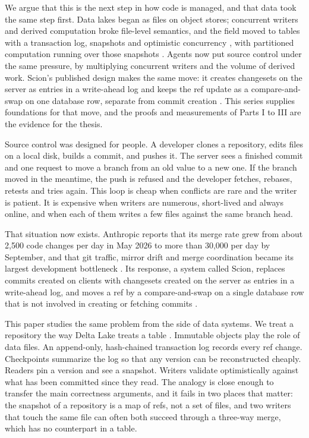 \documentclass[11pt,letterpaper]{article}
\theoremstyle{definition}
\theoremstyle{remark}
\begin{document}
We argue that this is the next step in how code is managed, and that data took the same step first. Data lakes began as files on object stores; concurrent writers and derived computation broke file-level semantics, and the field moved to tables with a transaction log, snapshots and optimistic concurrency \cite{armbrust2020delta,icebergspec}, with partitioned computation running over those snapshots \cite{zaharia2012rdd}. Agents now put source control under the same pressure, by multiplying concurrent writers and the volume of derived work. Scion's published design makes the same move: it creates changesets on the server as entries in a write-ahead log and keeps the ref update as a compare-and-swap on one database row, separate from commit creation \cite{anthropic2026scion}. This series supplies foundations for that move, and the proofs and measurements of Parts I to III are the evidence for the thesis.

Source control was designed for people. A developer clones a repository, edits files on a local disk, builds a commit, and pushes it. The server sees a finished commit and one request to move a branch from an old value to a new one. If the branch moved in the meantime, the push is refused and the developer fetches, rebases, retests and tries again. This loop is cheap when conflicts are rare and the writer is patient. It is expensive when writers are numerous, short-lived and always online, and when each of them writes a few files against the same branch head.

That situation now exists. Anthropic reports that its merge rate grew from about 2,500 code changes per day in May 2026 to more than 30,000 per day by September, and that git traffic, mirror drift and merge coordination became its largest development bottleneck \cite{anthropic2026scion}. %
Its response, a system called Scion, replaces commits created on clients with changesets created on the server as entries in a write-ahead log, and moves a ref by a compare-and-swap on a single database row that is not involved in creating or fetching commits \cite{anthropic2026scion}. %

This paper studies the same problem from the side of data systems. We treat a repository the way Delta Lake treats a table \cite{armbrust2020delta}. Immutable objects play the role of data files. An append-only, hash-chained transaction log records every ref change. Checkpoints summarize the log so that any version can be reconstructed cheaply. Readers pin a version and see a snapshot. Writers validate optimistically against what has been committed since they read. The analogy is close enough to transfer the main correctness arguments, and it fails in two places that matter: the snapshot of a repository is a map of refs, not a set of files, and two writers that touch the same file can often both succeed through a three-way merge, which has no counterpart in a table.
\end{document}
